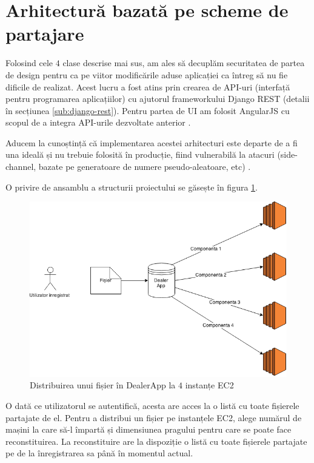 \documentclass[oneside, 12pt]{book}
\begin{document}
\section{Arhitectură bazată pe scheme de partajare}

Folosind cele $4$ clase descrise mai sus, am ales să decuplăm securitatea de partea de design pentru ca pe viitor modificările aduse aplicației ca întreg să nu fie dificile de realizat. Acest lucru a fost atins prin crearea de API-uri (interfață pentru programarea aplicațiilor) cu ajutorul frameworkului Django REST (detalii în secțiunea \ref{sub:django-rest}). Pentru partea de UI am folosit AngularJS cu scopul de a integra API-urile dezvoltate anterior \cite{website:angularjs}.

Aducem la cunoștință că implementarea acestei arhitecturi este departe de a fi una ideală și nu trebuie folosită în producție, fiind vulnerabilă la atacuri (side-channel, bazate pe generatoare de numere pseudo-aleatoare, etc) \cite{kocher:1996timing, fgutterman:2006analysis}.

O privire de ansamblu a structurii proiectului se găsește în figura \ref{fig:dealerapp}.

\begin{figure}
	\begin{center}
	\includegraphics[width=1\textwidth]{img/DealerApp.png}
	\caption{Distribuirea unui fișier în DealerApp la $4$ instanțe EC2}
	\label{fig:dealerapp}
	\end{center}
	\bigskip
\end{figure}


O dată ce utilizatorul se autentifică, acesta are acces la o listă cu toate fișierele partajate de el. Pentru a distribui un fișier pe instanțele EC2, alege numărul de mașini la care să-l împartă și dimensiunea pragului pentru care se poate face reconstituirea. La reconstituire are la dispoziție o listă cu toate fișierele partajate pe de la înregistrarea sa până în momentul actual.
\end{document}
